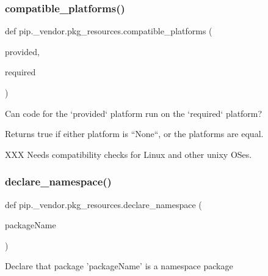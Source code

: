 \subsubsection{\texorpdfstring{compatible\+\_\+platforms()}{compatible\_platforms()}}
{\footnotesize\ttfamily def pip.\+\_\+vendor.\+pkg\+\_\+resources.\+compatible\+\_\+platforms (\begin{DoxyParamCaption}\item[{}]{provided,  }\item[{}]{required }\end{DoxyParamCaption})}

\begin{DoxyVerb}Can code for the `provided` platform run on the `required` platform?

Returns true if either platform is ``None``, or the platforms are equal.

XXX Needs compatibility checks for Linux and other unixy OSes.
\end{DoxyVerb}
 \mbox{\label{namespacepip_1_1__vendor_1_1pkg__resources_a49c145737085dcb078a6d33c508f816c}} 
\subsubsection{\texorpdfstring{declare\+\_\+namespace()}{declare\_namespace()}}
{\footnotesize\ttfamily def pip.\+\_\+vendor.\+pkg\+\_\+resources.\+declare\+\_\+namespace (\begin{DoxyParamCaption}\item[{}]{package\+Name }\end{DoxyParamCaption})}

\begin{DoxyVerb}Declare that package 'packageName' is a namespace package\end{DoxyVerb}
 \mbox{\label{namespacepip_1_1__vendor_1_1pkg__resources_a40ecc69f1bfb2ad4d6b126f1ffe89249}} 

